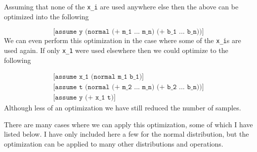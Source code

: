 \documentclass[a4paper]{article}
\begin{document}
Assuming that none of the \texttt{x\_i} are used anywhere else then the above can be optimized into the following

\[
	\texttt{[assume y (normal (+ m\_1 ...\ m\_n) (+ b\_1 ...\ b\_n))]}
\]
We can even perform this optimization in the case where some of the \texttt{x\_i}s are used again. If only \texttt{x\_1} were used elsewhere then we could optimize to the following

\[
	\begin{array}{l}
		\texttt{[assume x\_1 (normal m\_1 b\_1)]} \\
		\texttt{[assume t (normal (+ m\_2 ...\ m\_n) (+ b\_2 ...\ b\_n))]} \\
		\texttt{[assume y (+ x\_1 t)]}
	\end{array}
\]
Although less of an optimization we have still reduced the number of samples.

There are many cases where we can apply this optimization, some of which I have listed below. I have only included here a few for the normal distribution, but the optimization can be applied to many other distributions and operations.
\end{document}
